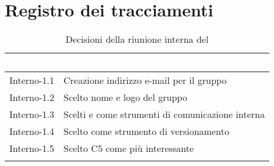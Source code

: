 \section{Registro dei tracciamenti}
{
\renewcommand{\arraystretch}{1.5}
\centering
\begin{longtable}{C{3cm} C{9cm}}
\textcolor{white}{\textbf{Codice}}&
\textcolor{white}{\textbf{Decisione}}\\	
\endhead
		
Interno-1.1 & Creazione indirizzo e-mail per il gruppo\\

Interno-1.2 & Scelto nome e logo del gruppo\\

Interno-1.3 & Scelti  e  come strumenti di comunicazione interna\\

Interno-1.4 & Scelto  come strumento di versionamento\\

Interno-1.5 & Scelto C5 come  più interessante\\
		
\caption{Decisioni della riunione interna del \Data{}}		
\end{longtable}
}
